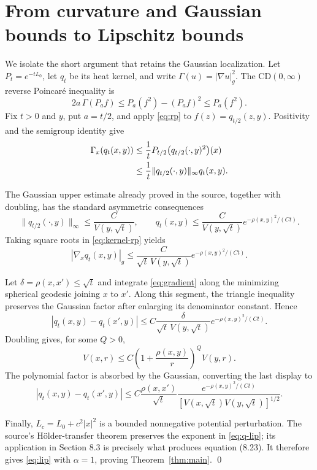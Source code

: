 \documentclass[11pt]{article}
\newcommand{\Gammaf}{\Gamma}
\begin{document}
\section{From curvature and Gaussian bounds to Lipschitz bounds}

We isolate the short argument that retains the Gaussian localization.  Let
$P_t=e^{-tL_0}$, let $q_t$ be its heat kernel, and write
$\Gammaf(u)=|\nabla u|_g^2$.  The $\mathrm{CD}(0,\infty)$ reverse Poincar\'e
inequality is
\begin{equation}\label{eq:rp}
 2a\,\Gammaf(P_a f)
 \le P_a(f^2)-(P_af)^2\le P_a(f^2).
\end{equation}
Fix $t>0$ and $y$, put $a=t/2$, and apply \eqref{eq:rp} to
$f(z)=q_{t/2}(z,y)$.  Positivity and the semigroup identity give
\begin{align}
 \Gammaf_x(q_t(x,y))
 &\le \frac1t P_{t/2}\big(q_{t/2}(\cdot,y)^2\big)(x)\notag\\
 &\le \frac1t\|q_{t/2}(\cdot,y)\|_\infty q_t(x,y).
 \label{eq:kernel-rp}
\end{align}

The Gaussian upper estimate already proved in the source, together with
doubling, has the standard asymmetric consequences
\[
 \|q_{t/2}(\cdot,y)\|_\infty\le \frac{C}{V(y,\sqrt t)},
 \qquad
 q_t(x,y)\le \frac{C}{V(y,\sqrt t)}
       e^{-\rho(x,y)^2/(Ct)}.
\]
Taking square roots in \eqref{eq:kernel-rp} yields
\begin{equation}\label{eq:gradient}
 |\nabla_xq_t(x,y)|_g
 \le \frac{C}{\sqrt t\,V(y,\sqrt t)}
       e^{-\rho(x,y)^2/(Ct)}.
\end{equation}

Let $\delta=\rho(x,x')\le\sqrt t$ and integrate
\eqref{eq:gradient} along the minimizing spherical geodesic joining $x$ to
$x'$.  Along this segment, the triangle inequality preserves the Gaussian
factor after enlarging its denominator constant.  Hence
\[
 |q_t(x,y)-q_t(x',y)|
 \le C\frac{\delta}{\sqrt t\,V(y,\sqrt t)}
       e^{-\rho(x,y)^2/(Ct)}.
\]
Doubling gives, for some $Q>0$,
\[
 V(x,r)\le C\left(1+\frac{\rho(x,y)}r\right)^Q V(y,r).
\]
The polynomial factor is absorbed by the Gaussian, converting the last
display to
\begin{equation}\label{eq:q-lip}
 |q_t(x,y)-q_t(x',y)|
 \le C\frac{\rho(x,x')}{\sqrt t}
 \frac{e^{-\rho(x,y)^2/(Ct)}}
 {[V(x,\sqrt t)V(y,\sqrt t)]^{1/2}}.
\end{equation}

Finally, $L_c=L_0+c^2|x|^2$ is a bounded nonnegative potential
perturbation.  The source's H\"older-transfer theorem
\cite[Theorem~2.2]{BKP2022} preserves the exponent in
\eqref{eq:q-lip}; its application in Section 8.3 is precisely what produces
equation (8.23).  It therefore gives \eqref{eq:lip} with $\alpha=1$, proving
Theorem~\ref{thm:main}. \qed
\end{document}
